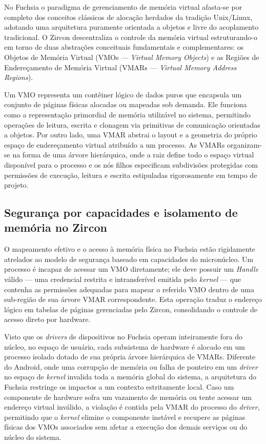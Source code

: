 \documentclass[12pt,a4paper]{article}
\begin{document}
No Fuchsia o paradigma de gerenciamento de memória virtual afasta-se por
completo dos conceitos clássicos de alocação herdados da tradição Unix/Linux,
adotando uma arquitetura puramente orientada a objetos e livre do acoplamento
tradicional. O Zircon descentraliza o controle da memória virtual estruturando-o
em torno de duas abstrações conceituais fundamentais e complementares: os
Objetos de Memória Virtual (VMOs --- \emph{Virtual Memory Objects}) e as Regiões
de Endereçamento de Memória Virtual (VMARs --- \emph{Virtual Memory Address
Regions}).

Um VMO representa um contêiner lógico de dados puros que encapsula um conjunto
de páginas físicas alocadas ou mapeadas sob demanda. Ele funciona como a
representação primordial de memória utilizável no sistema, permitindo operações
de leitura, escrita e clonagem via primitivas de comunicação orientadas a
objetos. Por outro lado, uma VMAR abstrai o layout e a geometria do próprio
espaço de endereçamento virtual atribuído a um processo. As VMARs organizam-se
na forma de uma árvore hierárquica, onde a raiz define todo o espaço virtual
disponível para o processo e os nós filhos especificam subdivisões protegidas
com permissões de execução, leitura e escrita estipuladas rigorosamente em tempo
de projeto.

\subsection{Segurança por capacidades e isolamento de memória no Zircon}

O mapeamento efetivo e o acesso à memória física no Fuchsia estão rigidamente
atrelados ao modelo de segurança baseado em capacidades do micronúcleo. Um
processo é incapaz de acessar um VMO diretamente; ele deve possuir um
\emph{Handle} válido --- uma credencial restrita e intransferível emitida pelo
\emph{kernel} --- que contenha as permissões adequadas para mapear o referido
VMO dentro de uma sub-região de sua árvore VMAR correspondente. Esta operação
traduz o endereço lógico em tabelas de páginas gerenciadas pelo Zircon,
consolidando o controle de acesso direto por hardware.

Visto que os \emph{drivers} de dispositivos no Fuchsia operam inteiramente fora
do núcleo, no espaço de usuário, cada subsistema de hardware é alocado em um
processo isolado dotado de sua própria árvore hierárquica de VMARs. Diferente do
Android, onde uma corrupção de memória ou falha de ponteiro em um \emph{driver}
no espaço de \emph{kernel} invalida toda a memória global do sistema, a
arquitetura do Fuchsia restringe os impactos a um contexto estritamente local.
Caso um componente de hardware sofra um vazamento de memória ou tente acessar um
endereço virtual inválido, a violação é contida pela VMAR do processo do
\emph{driver}, permitindo que o \emph{kernel} elimine o componente instável e
recupere as páginas físicas dos VMOs associados sem afetar a execução dos demais
serviços ou do núcleo do sistema.
\end{document}
